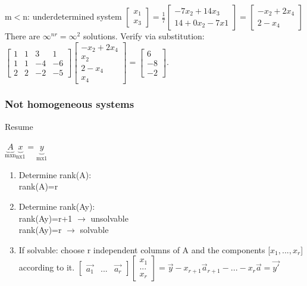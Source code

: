 \begin{frame}
\begin{block}{m$<$n: underdetermined system}
		$\begin{bmatrix}
		x_1\\x_3
		\end{bmatrix}=\frac{1}{7}\begin{bmatrix}
		-7x_2+14x_3\\14+0x_2-7x1
		\end{bmatrix}=\begin{bmatrix}
		-x_2+2x_4\\2-x_4
		\end{bmatrix}$\\
		There are $\infty^{nr}=\infty^2$ solutions. Verify via substitution: $\begin{bmatrix}
		1 & 1 & 3 & 1\\
		1 & 1 & -4 & -6\\
		2 & 2 & -2 & -5
		\end{bmatrix}\begin{bmatrix}
		-x_2+2x_4\\
		x_2\\
		2-x_4\\
		x_4
		\end{bmatrix}=\begin{bmatrix}
		6\\-8\\-2
		\end{bmatrix}$.
	\end{block}
\end{frame}

\begin{frame}
	\frametitle{Not homogeneous systems}
	\begin{block}{Resume}
		\begin{center}
			$\underbrace{A}_\text{mxn}\underbrace{x}_\text{nx1}=\underbrace{y}_\text{mx1}$
		\end{center}
		\begin{enumerate}
			\item Determine rank(A):\\
			rank(A)=r
			\item Determine rank(Ay):\\
			rank(Ay)=r+1 $\rightarrow$ unsolvable\\
			rank(Ay)=r $\rightarrow$ solvable
			\item If solvable: choose r independent columns of A and the components [$x_1,...,x_r$] according to it. $\begin{bmatrix} \overrightarrow{a_1} & ... & \overrightarrow{a_r} \end{bmatrix}\begin{bmatrix}
			x_1 \\ ... \\ x_r \end{bmatrix}=\overrightarrow{y}-x_{r+1}\overrightarrow{a}_{r+1}-...-x_r\overrightarrow{a}=\overrightarrow{y'}$
		\end{enumerate}
	\end{block}
\end{frame}

